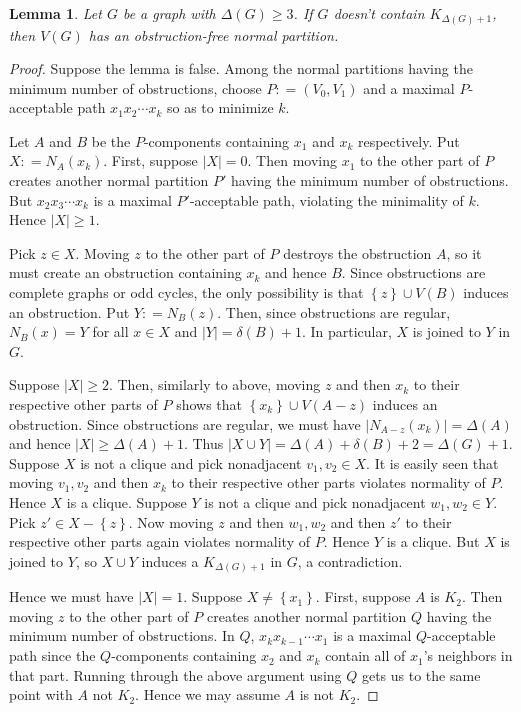 \documentclass[12pt]{amsart}
\theoremstyle{plain}
\newtheorem{lem}[thm]{Lemma}
\theoremstyle{definition}
\theoremstyle{remark}
\newcommand{\set}[1]{\left\{ #1 \right\}}
\newcommand{\card}[1]{\left|#1\right|}
\newcommand{\DefinedAs}{\mathrel{\mathop:}=}
\begin{document}
\begin{lem}\label{ObstructionFree}
Let $G$ be a graph with $\Delta(G) \geq 3$.  If $G$ doesn't contain
$K_{\Delta(G) + 1}$, then $V(G)$ has an obstruction-free normal partition.
\end{lem}
\begin{proof}
Suppose the lemma is false.  Among the normal partitions having the minimum
number of obstructions, choose $P \DefinedAs (V_0, V_1)$ and a
maximal $P$-acceptable path $x_1x_2\cdots x_k$ so as to minimize $k$.

Let $A$ and $B$ be the $P$-components containing $x_1$ and $x_k$ respectively.  
Put $X \DefinedAs N_A(x_k)$. First, suppose $\card{X} = 0$.  Then moving $x_1$ to the
other part of $P$ creates another normal partition $P'$ having the minimum number of
obstructions.  But $x_2x_3\cdots x_k$ is a maximal $P'$-acceptable path,
violating the minimality of $k$.  Hence $\card{X} \geq 1$.

Pick $z \in X$. Moving $z$ to the other part of $P$ destroys the obstruction $A$, so it must create an obstruction containing $x_k$ and hence $B$.  Since obstructions are complete graphs or odd cycles, the only possibility is that $\set{z} \cup V(B)$ induces an
obstruction.  Put $Y \DefinedAs N_B(z)$.  Then, since obstructions are regular, $N_B(x) = Y$ for all $x \in X$ and $\card{Y} = \delta(B) + 1$.  In particular, $X$ is joined to $Y$ in $G$.

Suppose $\card{X} \geq 2$.  Then, similarly to above, moving $z$ and then $x_k$ to their respective other parts of $P$ shows that $\set{x_k} \cup V(A - z)$ induces an obstruction.  Since obstructions are regular, we must have $\card{N_{A-z}(x_k)} = \Delta(A)$ and hence $\card{X} \geq \Delta(A) + 1$.  Thus $\card{X \cup Y} = \Delta(A) + \delta(B) + 2 = \Delta(G) + 1$.  Suppose $X$ is not a clique and pick nonadjacent $v_1, v_2 \in X$. It is easily seen that moving $v_1, v_2$ and then $x_k$ to their respective other parts violates normality of $P$.  Hence $X$ is a clique. Suppose $Y$ is not a clique and pick nonadjacent $w_1, w_2 \in Y$.  Pick $z' \in X - \set{z}$. Now moving $z$ and then $w_1, w_2$ and then $z'$ to their respective other parts again violates normality of $P$.  Hence $Y$ is a clique.  But $X$ is joined to $Y$, so $X \cup Y$ induces a $K_{\Delta(G) + 1}$ in $G$, a contradiction.

Hence we must have $\card{X} = 1$.  Suppose $X \neq \set{x_1}$.  First, suppose $A$ is $K_2$.  Then moving $z$ to the other part of $P$ creates another normal partition $Q$ having the minimum number of obstructions.  In $Q$, $x_kx_{k-1}\cdots x_1$ is a maximal $Q$-acceptable path since the $Q$-components containing $x_2$ and $x_k$ contain all of $x_1$'s neighbors in that part.  Running through the above argument using $Q$ gets us to the same point with $A$ not $K_2$.  Hence we may assume $A$ is not $K_2$.


\end{proof}
\end{document}
